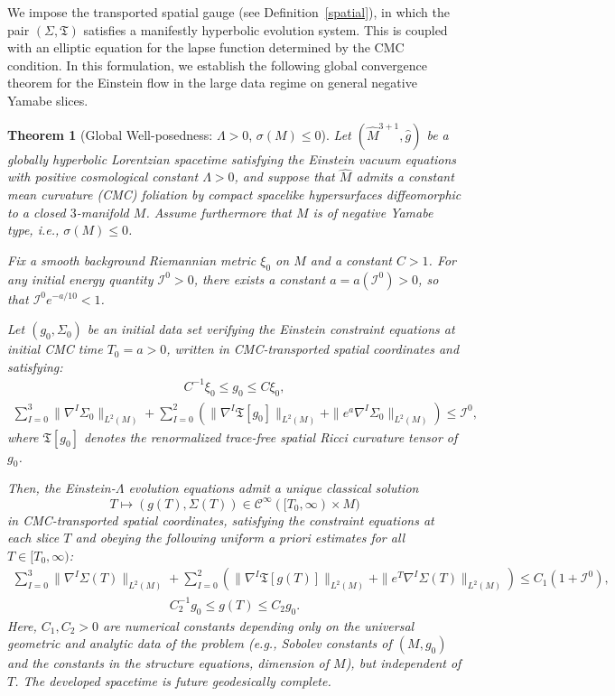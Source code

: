 \documentclass{amsart}
\newtheorem{theorem}{Theorem}[section]
\begin{document}
\noindent We impose the transported spatial gauge (see Definition~\ref{spatial}), in which the pair $(\Sigma, \mathfrak{T})$ satisfies a manifestly hyperbolic evolution system. This is coupled with an elliptic equation for the lapse function determined by the CMC condition. In this formulation, we establish the following global convergence theorem for the Einstein flow in the large data regime on general negative Yamabe slices.



\begin{theorem}[Global Well-posedness: $\Lambda > 0$, $\sigma(M) \leq 0$]
\label{main}
Let $(\widehat{M}^{3+1}, \widehat{g})$ be a globally hyperbolic Lorentzian spacetime satisfying the Einstein vacuum equations with positive cosmological constant $\Lambda > 0$, and suppose that $\widehat{M}$ admits a constant mean curvature (CMC) foliation by compact spacelike hypersurfaces diffeomorphic to a closed $3$-manifold $M$. Assume furthermore that $M$ is of negative Yamabe type, i.e., $\sigma(M) \leq 0$.

\noindent Fix a smooth background Riemannian metric $\xi_0$ on $M$ and a constant $C > 1$. For any initial energy quantity $\mathcal{I}^{0} > 0$, there exists a constant $a = a(\mathcal{I}^{0}) > 0$, so that $\mathcal{I}^{0} e^{-a/10} < 1$.

\noindent Let $(g_0, \Sigma_0)$ be an initial data set verifying the Einstein constraint equations at initial CMC time $T_0 = a>0$, written in CMC-transported spatial coordinates and satisfying:
\begin{align}
\label{eq:1}
C^{-1} \xi_0 \leq g_0 \leq C \xi_0,
\end{align}
\begin{align}
\label{eq:2}
\sum_{I = 0}^{3} \| \nabla^I \Sigma_0 \|_{L^2(M)} + \sum_{I = 0}^{2} \left( \| \nabla^I \mathfrak{T}[g_0] \|_{L^2(M)} + \| e^a \nabla^I \Sigma_0 \|_{L^2(M)} \right) \leq \mathcal{I}^0,
\end{align}
where $\mathfrak{T}[g_0]$ denotes the renormalized trace-free spatial Ricci curvature tensor of $g_0$.

\noindent Then, the Einstein-$\Lambda$ evolution equations admit a unique classical solution
\[
T \mapsto (g(T), \Sigma(T)) \in \mathcal{C}^\infty([T_0, \infty) \times M)
\]
in CMC-transported spatial coordinates, satisfying the constraint equations at each slice $T$ and obeying the following uniform a priori estimates for all $T \in [T_0, \infty)$:
\begin{align}
\sum_{I = 0}^{3} \| \nabla^I \Sigma(T) \|_{L^2(M)} + \sum_{I = 0}^{2} \left( \| \nabla^I \mathfrak{T}[g(T)] \|_{L^2(M)} + \| e^T \nabla^I \Sigma(T) \|_{L^2(M)} \right) \leq C_1(1 + \mathcal{I}^0),
\end{align}
\begin{align}
C_2^{-1} g_0 \leq g(T) \leq C_2 g_0.
\end{align}
Here, $C_1, C_2 > 0$ are numerical constants depending only on the universal geometric and analytic data of the problem (e.g., Sobolev constants of $(M, g_0)$ and the constants in the structure equations, dimension of $M$), but independent of $T$. The developed spacetime is future geodesically complete.


\end{theorem}
\end{document}
